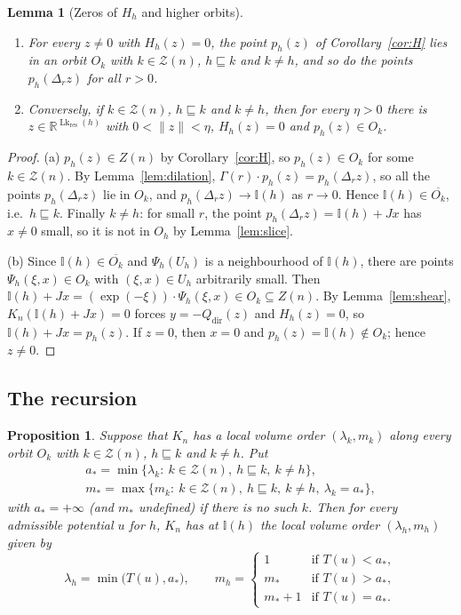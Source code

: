 \documentclass[11pt,a4paper]{article}
\newtheorem{proposition}[theorem]{Proposition}
\newtheorem{lemma}[theorem]{Lemma}
\theoremstyle{definition}
\theoremstyle{remark}
\numberwithin{equation}{section}
\newcommand{\R}{\mathbb{R}}
\newcommand{\norm}[1]{\lVert #1\rVert}
\newcommand{\Zb}{\mathcal Z}
\newcommand{\I}{\mathbb I}
\newcommand{\Lk}{\operatorname{Lk}}
\begin{document}
\begin{lemma}[Zeros of $H_h$ and higher orbits]\label{lem:higher}
\begin{enumerate}[label=\textup{(\alph*)}]
\item For every $z\neq0$ with $H_h(z)=0$, the point $p_h(z)$ of Corollary~\ref{cor:H} lies in an orbit $O_k$ with $k\in\Zb(n)$, $h\sqsubseteq k$ and $k\neq h$, and so do the points $p_h(\Delta_rz)$ for all $r>0$.
\item Conversely, if $k\in\Zb(n)$, $h\sqsubseteq k$ and $k\neq h$, then for every $\eta>0$ there is $z\in\R^{\Lk_{\mathrm{res}}(h)}$ with $0<\norm z<\eta$, $H_h(z)=0$ and $p_h(z)\in O_k$.
\end{enumerate}
\end{lemma}
\begin{proof}
(a) $p_h(z)\in Z(n)$ by Corollary~\ref{cor:H}, so $p_h(z)\in O_k$ for some $k\in\Zb(n)$. By Lemma~\ref{lem:dilation}, $\Gamma(r)\cdot p_h(z)=p_h(\Delta_rz)$, so all the points $p_h(\Delta_rz)$ lie in $O_k$, and $p_h(\Delta_rz)\to\I(h)$ as $r\to0$. Hence $\I(h)\in\overline{O_k}$, i.e.\ $h\sqsubseteq k$. Finally $k\neq h$: for small $r$, the point $p_h(\Delta_rz)=\I(h)+Jx$ has $x\neq0$ small, so it is not in $O_h$ by Lemma~\ref{lem:slice}.

(b) Since $\I(h)\in\overline{O_k}$ and $\Psi_h(U_h)$ is a neighbourhood of $\I(h)$, there are points $\Psi_h(\xi,x)\in O_k$ with $(\xi,x)\in U_h$ arbitrarily small. Then $\I(h)+Jx=(\exp(-\xi))\cdot\Psi_h(\xi,x)\in O_k\subseteq Z(n)$. By Lemma~\ref{lem:shear}, $K_n(\I(h)+Jx)=0$ forces $y=-Q_{\mathrm{dir}}(z)$ and $H_h(z)=0$, so $\I(h)+Jx=p_h(z)$. If $z=0$, then $x=0$ and $p_h(z)=\I(h)\notin O_k$; hence $z\neq0$.
\end{proof}

\subsection{The recursion}
\begin{proposition}\label{prop:recursion}
Suppose that $K_n$ has a local volume order $(\lambda_k,m_k)$ along every orbit $O_k$ with $k\in\Zb(n)$, $h\sqsubseteq k$ and $k\neq h$. Put
\begin{gather*}
a_*=\min\{\lambda_k:\ k\in\Zb(n),\ h\sqsubseteq k,\ k\neq h\},\\
m_*=\max\{m_k:\ k\in\Zb(n),\ h\sqsubseteq k,\ k\neq h,\ \lambda_k=a_*\},
\end{gather*}
with $a_*=+\infty$ (and $m_*$ undefined) if there is no such $k$. Then for every admissible potential $u$ for $h$, $K_n$ has at $\I(h)$ the local volume order $(\lambda_h,m_h)$ given by
\[
\lambda_h=\min\bigl(T(u),a_*\bigr),\qquad m_h=\begin{cases}1&\text{if }T(u)<a_*,\\ m_*&\text{if }T(u)>a_*,\\ m_*+1&\text{if }T(u)=a_*.\end{cases}
\]
\end{proposition}
\end{document}
